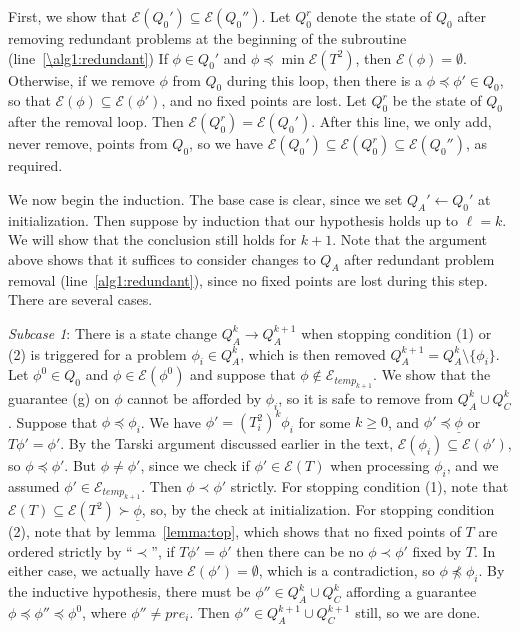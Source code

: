 \documentclass[11pt,reqno]{amsart}
\theoremstyle{definition}
\numberwithin{equation}{section}
\newcommand{\ul}{\underline}
\newcommand{\pre}{\phi}
\newcommand{\sub}{\subseteq}
\newcommand{\fix}{\mathcal{E}}
\newcommand{\peq}{\preceq}
\newcommand{\pe}{\prec}
\newcommand{\bopre}{\ul{\pre}}
\newcommand{\acto}{Q_0}
\newcommand{\actak}{Q_A^k}
\newcommand{\acta}{Q_A}
\newcommand{\actak}{Q_A^{k}}
\newcommand{\actakk}{Q_A^{k + 1}}
\newcommand{\actck}{Q_C^k}
\newcommand{\actckk}{Q_C^{k + 1}}
\newcommand{\preo}{\pre^{0}}
\newcommand{\fixtemp}{\mathcal{E}_{temp}}
\begin{document}
\begin{enumerate}
First, we show that $\fix(\acto') \sub \fix(\acto'')$. 
Let $\acto^r$ denote the state of $\acto$ after removing redundant problems at the beginning of the subroutine (line~\ref{\alg1:redundant})
If $\pre \in \acto'$ and $\pre \peq \min \fix(T^2)$, then $\fix(\pre) = \emptyset$. 
Otherwise, if we remove $\pre$ from $\acto$ during this loop, then there is a $\pre \peq \pre' \in \acto$, so that $\fix(\pre) \sub \fix(\pre')$, and no fixed points are lost.
Let $\acto^r$ be the state of $\acto$ after the removal loop.
Then $\fix(\acto^r) = \fix(\acto')$.
After this line, we only add, never remove, points from $\acto$, so we have $\fix(\acto') \sub \fix(\acto^r) \sub \fix(\acto'')$, as required.

We now begin the induction.
The base case is clear, since we set $\acta' \leftarrow \acto'$ at initialization.
Then suppose by induction that our hypothesis holds up to $\ell = k$.
We will show that the conclusion still holds for $k + 1$.
Note that the argument above shows that it suffices to consider changes to $\acta$ after redundant problem removal (line~\ref{alg1:redundant}), since no fixed points are lost during this step.
There are several cases.

\emph{Subcase 1}: There is a state change $\actak \to \actakk$ when stopping condition (1) or (2) is triggered for a problem $\pre_i \in \actak$, which is then removed $\actakk = \actak \setminus \{\pre_i\}$.
Let $\preo \in \acto$ and $\pre \in \fix(\preo)$ and suppose that $\pre \not \in \fixtemp_{k + 1}$.
We show that the guarantee (g) on $\pre$ cannot be afforded by $\pre_i$, so it is safe to remove from $\actak \cup \actck$.
Suppose that $\pre \peq \pre_i$.
We have $\pre' = (T_i^2)^k \pre_i$ for some $k \geq 0$, and $\pre' \peq \bopre$ or $T \pre' = \pre'$.
By the Tarski argument discussed earlier in the text, $\fix(\pre_i) \sub \fix(\pre')$, so $\pre \peq \pre'$.
But $\pre \not = \pre'$, since we check if $\pre' \in \fix(T)$ when processing $\pre_i$, and we assumed $\pre' \in \fixtemp_{k + 1}$.
Then $\pre \pe \pre'$ strictly.
For stopping condition (1), note that $\fix(T) \sub \fix(T^2) \succ \bopre$, so, by the check at initialization. 
For stopping condition (2), note that by lemma~\ref{lemma:top}, which shows that no fixed points of $T$ are ordered strictly by ``$\pe$'', if $T\pre' = \pre'$ then there can be no $\pre \pe \pre'$ fixed by $T$. 
In either case, we actually have $\fix(\pre') = \emptyset$, which is a contradiction, so $\pre \not \peq \pre_i$.
By the inductive hypothesis, there must be $\pre'' \in \actak \cup \actck$ affording a guarantee $\pre \peq \pre'' \peq \preo$, where $\pre'' \not = pre_i$.
Then $\pre'' \in \actakk \cup \actckk$ still, so we are done.


\end{enumerate}
\end{document}
